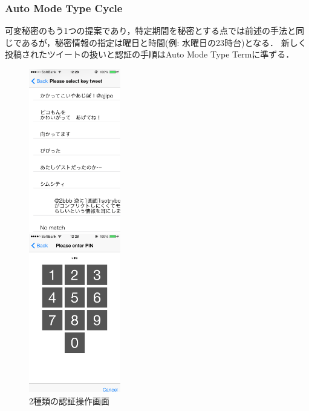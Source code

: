 \documentclass[twocolumn, a4paper, 9pt]{UECIEresume}
\begin{document}
\subsubsection{Auto Mode Type Cycle}
可変秘密のもう1つの提案であり，特定期間を秘密とする点では前述の手法と同じであるが，秘密情報の指定は曜日と時間(例: 水曜日の23時台)となる．
新しく投稿されたツイートの扱いと認証の手順はAuto Mode Type Termに準ずる．

\begin{figure}[ht]
  \begin{minipage}{0.49\hsize}
    \begin{center}
      \includegraphics[width=40mm]{img/notifauthNotificationTest.eps}
    \end{center}
  \end{minipage}
  \begin{minipage}{0.49\hsize}
    \begin{center}
      \includegraphics[width=40mm]{img/notifauthPINTest.eps}
    \end{center}
  \end{minipage}
  \caption{2種類の認証操作画面}
  \label{notifauthTest}
\end{figure}
\end{document}
